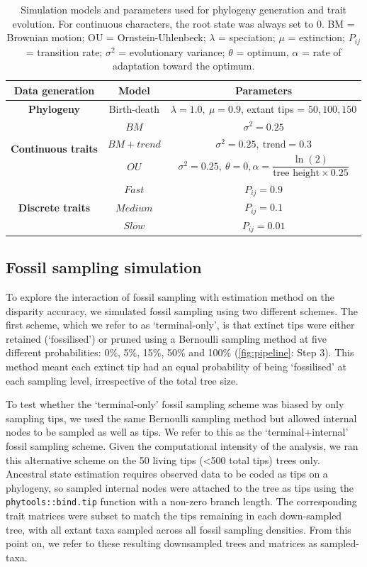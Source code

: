 \documentclass[11pt, a4paper]{article}
\begin{document}
\begin{table}[H]
\centering
\caption{Simulation models and parameters used for phylogeny generation and trait evolution. For continuous characters, the root state was always set to 0. BM = Brownian motion; OU = Ornstein-Uhlenbeck; $\lambda$ = speciation; $\mu$ = extinction; $P_{ij}$ = transition rate; $\sigma^2$ = evolutionary variance; $\theta$ = optimum, $\alpha$ = rate of adaptation toward the optimum.}
\label{tab:models}
\begin{tabular}{|c|c|c|}
\hline
\textbf{Data generation} & \textbf{Model} & \textbf{Parameters} \\
\hline
\textbf{Phylogeny} & Birth-death & $\lambda=1.0,\ \mu=0.9$, extant tips = $50, 100, 150$ \\
\hline
\multirow{3}{*}{\textbf{Continuous traits}} & $BM$ & $\sigma^2=0.25$ \\
\cline{2-3}
 & $BM + trend$ & $\sigma^2=0.25,\ \text{trend}=0.3$ \\
\cline{2-3}
 & $OU$ & $\sigma^2=0.25,\ \theta = 0, \alpha=\dfrac{\ln(2)}{\text{tree height} \times 0.25}$ \\
\hline
\multirow{3}{*}{\textbf{Discrete traits}} & $Fast$ & $P_{ij}=0.9$ \\
\cline{2-3}
 & $Medium$ & $P_{ij}=0.1$ \\
\cline{2-3}
 & $Slow$ & $P_{ij}=0.01$ \\
\hline
\end{tabular}
\end{table}


\subsection{Fossil sampling simulation}
To explore the interaction of fossil sampling with estimation method on the disparity accuracy, we simulated fossil sampling using two different schemes.
The first scheme, which we refer to as `terminal-only', is that extinct tips were either retained (`fossilised') or pruned using a Bernoulli sampling method at five different probabilities: 0\%, 5\%, 15\%, 50\% and 100\% (\autoref{fig:pipeline}: Step 3).
This method meant each extinct tip had an equal probability of being `fossilised' at each sampling level, irrespective of the total tree size.

To test whether the `terminal-only' fossil sampling scheme was biased by only sampling tips, we used the same Bernoulli sampling method but allowed internal nodes to be sampled as well as tips. %
We refer to this as the `terminal+internal' fossil sampling scheme.
Given the computational intensity of the analysis, we ran this alternative scheme on the 50 living tips (<500 total tips) trees only.
Ancestral state estimation requires observed data to be coded as tips on a phylogeny, so sampled internal nodes were attached to the tree as tips using the \texttt{phytools::bind.tip} function \citep{revell2012phytools} with a non-zero branch length.
The corresponding trait matrices were subset to match the tips remaining in each down-sampled tree, with all extant taxa sampled across all fossil sampling densities.
From this point on, we refer to these resulting downsampled trees and matrices as sampled-taxa.
\end{document}
